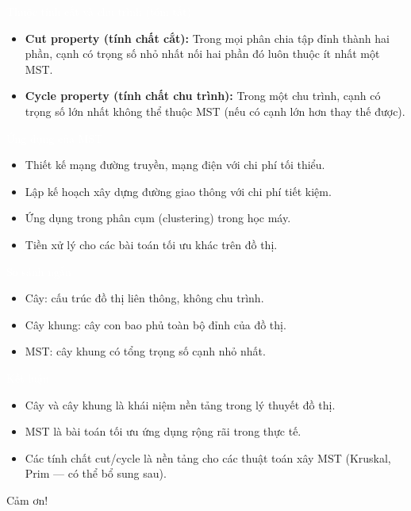 \documentclass{beamer}
\newcommand{\hlblue}[1]{\textcolor{myblue}{#1}}
\newcommand{\hlgreen}[1]{\textcolor{mygreen}{#1}}
\newcommand{\hlred}[1]{\textcolor{myred}{#1}}
\newcommand{\hlpurple}[1]{\textcolor{mypurple}{#1}}
\newcommand{\hlorange}[1]{\textcolor{myorange}{#1}}
\newcommand{\hlcyan}[1]{\textcolor{mycyan}{#1}}
\newcommand{\hlwhite}[1]{\textcolor{white}{#1}}
\begin{document}

\begin{frame}{\hlwhite{Thuộc tính cắt và chu trình (tóm tắt)}}
\begin{itemize}
  \item \textbf{\hlgreen{Cut property (tính chất cắt):}} Trong mọi phân chia tập đỉnh thành hai phần, cạnh có \hlred{trọng số nhỏ nhất} nối hai phần đó luôn thuộc ít nhất một MST.
  \item \textbf{\hlpurple{Cycle property (tính chất chu trình):}} Trong một chu trình, cạnh có \hlred{trọng số lớn nhất} không thể thuộc MST (nếu có cạnh lớn hơn thay thế được).
\end{itemize}
\end{frame}


\begin{frame}{\hlwhite{Ứng dụng của MST}}
\begin{itemize}
  \item Thiết kế \hlblue{mạng đường truyền}, \hlgreen{mạng điện} với chi phí tối thiểu.
  \item Lập kế hoạch xây dựng \hlorange{đường giao thông} với chi phí tiết kiệm.
  \item Ứng dụng trong \hlpurple{phân cụm (clustering)} trong học máy.
  \item \hlcyan{Tiền xử lý} cho các bài toán tối ưu khác trên đồ thị.
\end{itemize}
\end{frame}


\begin{frame}{\hlwhite{So sánh ngắn}}
\begin{tcolorbox}
\begin{itemize}
  \item \hlgreen{Cây}: cấu trúc đồ thị liên thông, không chu trình.
  \item \hlgreen{Cây khung}: cây con bao phủ toàn bộ đỉnh của đồ thị.
  \item \hlgreen{MST}: cây khung có tổng trọng số cạnh nhỏ nhất.
\end{itemize}
\end{tcolorbox}
\end{frame}


\begin{frame}{\hlwhite{Kết luận}}
\begin{itemize}
  \item Cây và cây khung là khái niệm nền tảng trong lý thuyết đồ thị.
  \item MST là bài toán tối ưu ứng dụng rộng rãi trong thực tế.
  \item Các tính chất cut/cycle là nền tảng cho các thuật toán xây MST (Kruskal, Prim — có thể bổ sung sau).
\end{itemize}

\centerline{\hlorange{Cảm ơn!}}
\end{frame}
\end{document}
